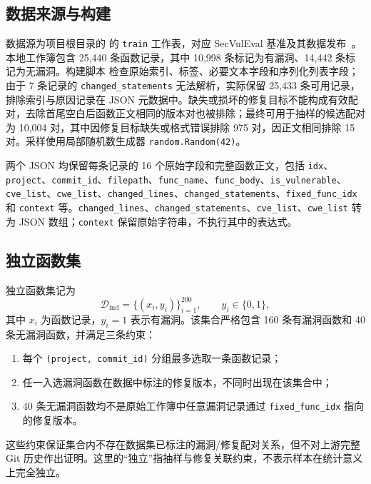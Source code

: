 \documentclass[conference]{IEEEtran}
\newcommand{\Dind}{\mathcal{D}_{\mathrm{ind}}}
\begin{document}
\subsection{数据来源与构建}
数据源为项目根目录的  的 \texttt{train} 工作表，对应 SecVulEval 基准及其数据发布~\cite{ahmed2026secvuleval,secvulevaldata}。本地工作簿包含 25{,}440 条函数记录，其中 10{,}998 条标记为有漏洞、14{,}442 条标记为无漏洞。构建脚本  检查原始索引、标签、必要文本字段和序列化列表字段；由于 7 条记录的 \texttt{changed\_statements} 无法解析，实际保留 25{,}433 条可用记录，排除索引与原因记录在 JSON 元数据中。缺失或损坏的修复目标不能构成有效配对，去除首尾空白后函数正文相同的版本对也被排除；最终可用于抽样的候选配对为 10{,}004 对，其中因修复目标缺失或格式错误排除 975 对，因正文相同排除 15 对。采样使用局部随机数生成器 \texttt{random.Random(42)}。

两个 JSON 均保留每条记录的 16 个原始字段和完整函数正文，包括 \texttt{idx}、\texttt{project}、\texttt{commit\_id}、\texttt{filepath}、\texttt{func\_name}、\texttt{func\_body}、\texttt{is\_vulnerable}、\texttt{cve\_list}、\texttt{cwe\_list}、\texttt{changed\_lines}、\texttt{changed\_statements}、\texttt{fixed\_func\_idx} 和 \texttt{context} 等。\texttt{changed\_lines}、\texttt{changed\_statements}、\texttt{cve\_list}、\texttt{cwe\_list} 转为 JSON 数组；\texttt{context} 保留原始字符串，不执行其中的表达式。

\subsection{独立函数集}
独立函数集记为
\begin{equation}
\Dind=\{(x_i,y_i)\}_{i=1}^{200},\qquad y_i\in\{0,1\},
\end{equation}
其中 $x_i$ 为函数记录，$y_i=1$ 表示有漏洞。该集合严格包含 160 条有漏洞函数和 40 条无漏洞函数，并满足三条约束：
\begin{enumerate}
    \item 每个 \texttt{(project, commit\_id)} 分组最多选取一条函数记录；
    \item 任一入选漏洞函数在数据中标注的修复版本，不同时出现在该集合中；
    \item 40 条无漏洞函数均不是原始工作簿中任意漏洞记录通过 \texttt{fixed\_func\_idx} 指向的修复版本。
\end{enumerate}
这些约束保证集合内不存在数据集已标注的漏洞/修复配对关系，但不对上游完整 Git 历史作出证明。这里的“独立”指抽样与修复关联约束，不表示样本在统计意义上完全独立。
\end{document}
